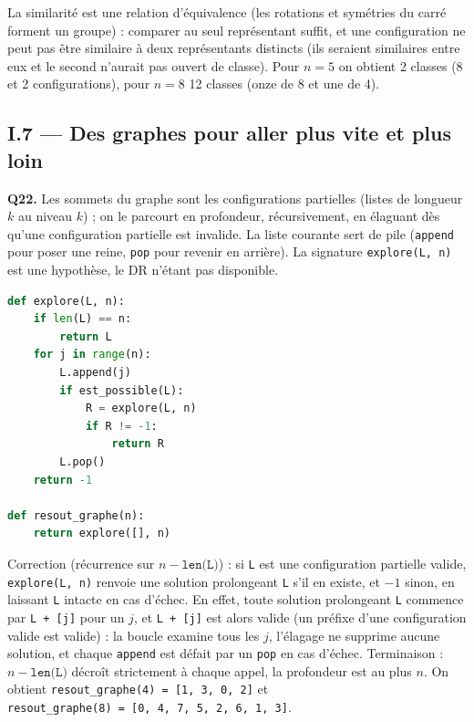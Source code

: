 \documentclass[11pt,a4paper]{article}
\begin{document}
La similarité est une relation d'équivalence (les rotations et symétries du carré forment un groupe) : comparer au seul représentant suffit, et une configuration ne peut pas être similaire à deux représentants distincts (ils seraient similaires entre eux et le second n'aurait pas ouvert de classe). Pour \(n = 5\) on obtient 2 classes (8 et 2 configurations), pour \(n = 8\) 12 classes (onze de 8 et une de 4).

\hypertarget{i.7-des-graphes-pour-aller-plus-vite-et-plus-loin}{%
\subsection{I.7 --- Des graphes pour aller plus vite et plus loin}\label{i.7-des-graphes-pour-aller-plus-vite-et-plus-loin}}

\textbf{Q22.} Les sommets du graphe sont les configurations partielles (listes de longueur \(k\) au niveau \(k\)) ; on le parcourt en profondeur, récursivement, en élaguant dès qu'une configuration partielle est invalide. La liste courante sert de pile (\texttt{append} pour poser une reine, \texttt{pop} pour revenir en arrière). La signature \texttt{explore(L,\ n)} est une hypothèse, le DR n'étant pas disponible.

\begin{lstlisting}[language=Python]
def explore(L, n):
    if len(L) == n:
        return L
    for j in range(n):
        L.append(j)
        if est_possible(L):
            R = explore(L, n)
            if R != -1:
                return R
        L.pop()
    return -1

def resout_graphe(n):
    return explore([], n)
\end{lstlisting}

Correction (récurrence sur \(n - \texttt{len(L)}\)) : si \texttt{L} est une configuration partielle valide, \texttt{explore(L,\ n)} renvoie une solution prolongeant \texttt{L} s'il en existe, et \(-1\) sinon, en laissant \texttt{L} intacte en cas d'échec. En effet, toute solution prolongeant \texttt{L} commence par \texttt{L\ +\ {[}j{]}} pour un \(j\), et \texttt{L\ +\ {[}j{]}} est alors valide (un préfixe d'une configuration valide est valide) : la boucle examine tous les \(j\), l'élagage ne supprime aucune solution, et chaque \texttt{append} est défait par un \texttt{pop} en cas d'échec. Terminaison : \(n - \texttt{len(L)}\) décroît strictement à chaque appel, la profondeur est au plus \(n\). On obtient \texttt{resout\_graphe(\allowbreak{}4)\allowbreak{}\ =\allowbreak{}\ {[}1,\allowbreak{}\ 3,\allowbreak{}\ 0,\allowbreak{}\ 2{]}\allowbreak{}} et \texttt{resout\_graphe(\allowbreak{}8)\allowbreak{}\ =\allowbreak{}\ {[}0,\allowbreak{}\ 4,\allowbreak{}\ 7,\allowbreak{}\ 5,\allowbreak{}\ 2,\allowbreak{}\ 6,\allowbreak{}\ 1,\allowbreak{}\ 3{]}\allowbreak{}}.
\end{document}
